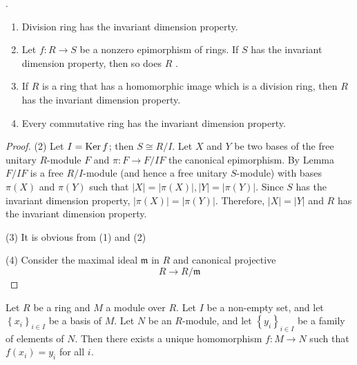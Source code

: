 \begin{theorem}.
    \begin{enumerate}
        \item
              Division ring has the invariant dimension property.

        \item
              Let $f: R \rightarrow S$ be a nonzero epimorphism of rings.
              If $S$ has the invariant dimension property, then so does $R$ .

        \item
              If $R$ is a ring that has a homomorphic image which is a division ring, then $R$ has the invariant dimension property.

        \item
              Every commutative ring has the invariant dimension property.
    \end{enumerate}


    \begin{proof}
        (2) Let $I=\operatorname{\operatorname{Ker}} f$; then $S \cong R / I$. Let $X$ and $Y$ be two bases of the free unitary $R$-module $F$ and $\pi: F \rightarrow F / I F$ the canonical epimorphism.
        By Lemma $F / I F$ is a free $R / I$-module (and hence a free unitary $S$-module) with bases $\pi(X)$ and $\pi(Y)$ such that $|X|=|\pi(X)|,|Y|=|\pi(Y)|$. Since $S$ has the invariant dimension property, $|\pi(X)|=|\pi(Y)|$. Therefore, $|X|=|Y|$ and $R$ has the invariant dimension property.

        (3) It is obvious from (1) and (2)

        (4) Consider the maximal ideal $\mathfrak{m}$ in $R$ and canonical projective
        \begin{equation*}
            R\rightarrow R/ \mathfrak{m}
        \end{equation*}
    \end{proof}
\end{theorem}



\begin{theorem}
    Let $R$ be a ring and $M$ a module over $R$. Let $I$ be a non-empty set, and let $\left\{x_i\right\}_{i \in I}$ be a basis of $M$. Let $N$ be an $R$-module, and let $\left\{y_i\right\}_{i \in I}$ be a family of elements of $N$. Then there exists a unique homomorphism $f: M \rightarrow N$ such that $f\left(x_i\right)=y_i$ for all $i$.
\end{theorem}




